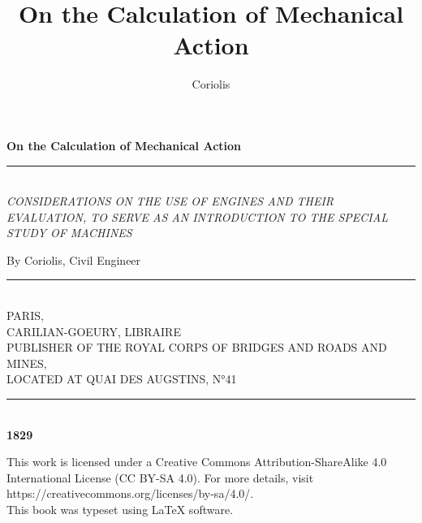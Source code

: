 \documentclass{book}
\title{On the Calculation of Mechanical Action}
\author{Coriolis}
\newcommand{\booksubtitle}{CONSIDERATIONS ON THE USE OF ENGINES AND THEIR EVALUATION, 
TO SERVE AS AN INTRODUCTION TO THE SPECIAL STUDY OF MACHINES}
\begin{document}
\frontmatter




\begin{titlepage}
\begin{center}

\textbf{\fontsize{48}{54}\selectfont On the Calculation of Mechanical Action}

\par\noindent\rule{\textwidth}{4pt}\\

\textit{\booksubtitle}


    
\Large By Coriolis, Civil Engineer
\par\noindent\rule{\textwidth}{3pt}\\
PARIS, \\
\small CARILIAN-GOEURY, LIBRAIRE\\ 
PUBLISHER OF THE ROYAL CORPS OF BRIDGES AND ROADS AND MINES,\\ LOCATED AT QUAI DES AUGSTINS, N°41 
\\
\par\noindent\rule{\textwidth}{2pt}\\

\textbf{1829} 

\end{center}


\vspace{\fill}


\end{titlepage}
\restoregeometry

\thispagestyle{empty}
\newpage
\begin{flushleft}
This work is licensed under a Creative Commons Attribution-ShareAlike 4.0 International License (CC BY-SA 4.0). For more details, visit \\https://creativecommons.org/licenses/by-sa/4.0/.\\
\vspace{80mm}
This book was typeset using \LaTeX{} software.\\
\end{flushleft}
\end{document}
